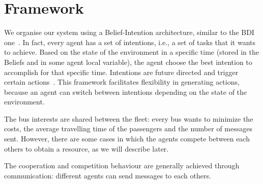 \section{Framework}

We organise our system using a Belief-Intention architecture, similar to the BDI one~\cite{caillou2017simple}. In fact, every agent has a set of intentions, i.e.,  a set of tasks that it wants to achieve. Based on the state of the environment in a specific time (stored in the Beliefs and in some agent local variable), the agent choose the best intention to accomplish for that specific time. Intentions are future directed and trigger certain actions~\cite{multiagentsystems}. This framework facilitates flexibility in generating actions, because an agent can switch between intentions depending on the state of the environment. 

The bus interests are shared between the fleet: every bus wants to minimize the costs, the average travelling time of the passengers and the number of messages sent. However, there are some cases in which the agents compete between each others to obtain a resource, as we will describe later.

The cooperation and competition behaviour are generally achieved through communication: different agents can send messages to each others. 